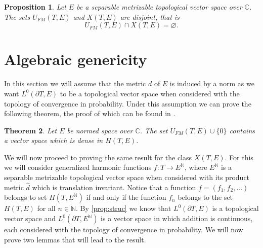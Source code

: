 \documentclass[twoside, 11pt]{article}
\newcommand{\C}{\mathbb{C}}
\newcommand{\N}{\mathbb{N}}
\theoremstyle{plain}
\newtheorem{theorem}{Theorem}[section]
\newtheorem{proposition}[theorem]{Proposition}
\theoremstyle{definition}
\begin{document}
\begin{proposition}
\label{prop:disjoint}
Let $E$ be a separable metrizable topological vector space over $\C$.
The sets $U_{FM}(T,E)$ and $X(T,E)$ are disjoint, that is $$U_{FM}(T,E) \cap X(T,E) = \varnothing.$$
\end{proposition}

\section{Algebraic genericity}

In this section we will assume that the metric $d$ of $E$ is induced by a norm as we want $L^0(\partial T, E)$ to be a topological vector space when considered with the topology of convergence in probability.
Under this assumption we can prove the following theorem, the proof of which can be found in \cite{BIEHLER1, BIEHLER2}.

\begin{theorem}
\label{thm:UFMalg}
Let $E$ be normed space over $\C$.
The set $U_{FM}(T,E)\cup \{0\}$ contains a vector space which is dense in $H(T,E)$.
\end{theorem}

We will now proceed to proving the same result for the class $X(T,E)$.
For this we will consider generalized harmonic functions $f:T \to E^{\N}$, where $E^{\N}$ is a separable metrizable topological vector space when considered with its product metric $\hat{d}$ which is translation invariant.
Notice that a function $f = (f_1,f_2,\dots)$ belongs to set $H(T,E^\N)$ if and only if the function $f_n$ belongs to the set $H(T,E)$ for all $n \in \N$.
By \cref{prop:struc} we know that $L^0(\partial T, E)$ is a topological vector space and $L^0(\partial T, E^{\N})$ is a vector space in which addition is continuous, each considered with the topology of convergence in probability.
We will now prove two lemmas that will lead to the result.
\end{document}
